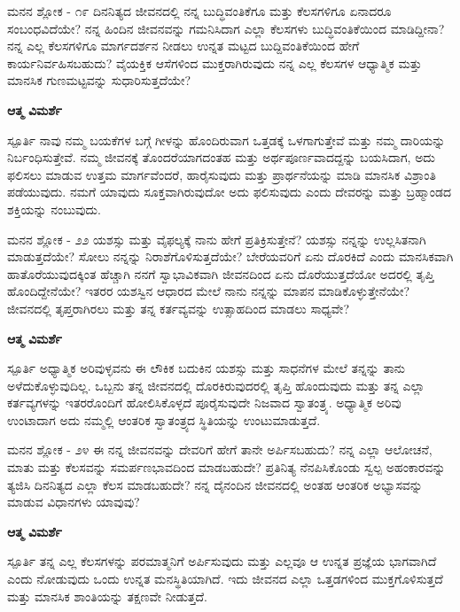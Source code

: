 \newpage
\begin{mananam}{\mananamfont ಮನನ ಶ್ಲೋಕ - ೧೯}
\mananamtext ದಿನನಿತ್ಯದ ಜೀವನದಲ್ಲಿ ನನ್ನ ಬುದ್ಧಿವಂತಿಕೆಗೂ ಮತ್ತು ಕೆಲಸಗಳಿಗೂ ಏನಾದರೂ ಸಂಬಂಧವಿದೆಯೇ? ನನ್ನ ಹಿಂದಿನ ಜೀವನವನ್ನು ಗಮನಿಸಿದಾಗ ಎಲ್ಲಾ ಕೆಲಸಗಳು ಬುದ್ಧಿವಂತಿಕೆಯಿಂದ ಮಾಡಿದ್ದೀನಾ? ನನ್ನ ಎಲ್ಲ ಕೆಲಸಗಳಿಗೂ ಮಾರ್ಗದರ್ಶನ ನೀಡಲು ಉನ್ನತ ಮಟ್ಟದ ಬುದ್ದಿವಂತಿಕೆಯಿಂದ ಹೇಗೆ ಕಾರ್ಯನಿರ್ವಹಿಸಬಹುದು? ವೈಯಕ್ತಿಕ ಆಸೆಗಳಿಂದ ಮುಕ್ತರಾಗಿರುವುದು ನನ್ನ ಎಲ್ಲ ಕೆಲಸಗಳ ಆಧ್ಯಾತ್ಮಿಕ ಮತ್ತು ಮಾನಸಿಕ ಗುಣಮಟ್ಟವನ್ನು ಸುಧಾರಿಸುತ್ತದೆಯೇ?
\end{mananam}
\WritingHand\enspace\textbf{ಆತ್ಮ ವಿಮರ್ಶೆ}\\
\begin{inspiration}{\mananamfont ಸ್ಪೂರ್ತಿ}
\mananamtext ನಾವು ನಮ್ಮ ಬಯಕೆಗಳ ಬಗ್ಗೆ ಗೀಳನ್ನು ಹೊಂದಿರುವಾಗ ಒತ್ತಡಕ್ಕೆ ಒಳಗಾಗುತ್ತೇವೆ ಮತ್ತು ನಮ್ಮ ದಾರಿಯನ್ನು ನಿರ್ಬಂಧಿಸುತ್ತೇವೆ. ನಮ್ಮ ಜೀವನಕ್ಕೆ ತೊಂದರೆಯಾಗದಂತಹ ಮತ್ತು ಅರ್ಥಪೂರ್ಣವಾದದ್ದನ್ನು ಬಯಸಿದಾಗ, ಅದು ಫಲಿಸಲು ಮಾಡುವ ಉತ್ತಮ ಮಾರ್ಗವೆಂದರೆ, ಹಾರೈಸುವುದು ಮತ್ತು ಪ್ರಾರ್ಥನೆಯನ್ನು ಮಾಡಿ ಮಾನಸಿಕ ವಿಶ್ರಾಂತಿ ಪಡೆಯುವುದು. ನಮಗೆ ಯಾವುದು ಸೂಕ್ತವಾಗಿರುವುದೋ ಅದು ಫಲಿಸುವುದು ಎಂದು ದೇವರನ್ನು ಮತ್ತು ಬ್ರಹ್ಮಾಂಡದ ಶಕ್ತಿಯನ್ನು ನಂಬುವುದು.
\end{inspiration}
\newpage

\begin{mananam}{\mananamfont ಮನನ ಶ್ಲೋಕ - ೨೨}
\mananamtext ಯಶಸ್ಸು ಮತ್ತು ವೈಫಲ್ಯಕ್ಕೆ ನಾನು ಹೇಗೆ ಪ್ರತಿಕ್ರಿಸುತ್ತೇನೆ? ಯಶಸ್ಸು ನನ್ನನ್ನು ಉಲ್ಲಸಿತನಾಗಿ ಮಾಡುತ್ತದೆಯೇ? ಸೋಲು ನನ್ನನ್ನು ನಿರಾಶೆಗೊಳಿಸುತ್ತದೆಯೇ? ಬೇರೆಯವರಿಗೆ ಏನು ದೊರಕಿದೆ ಎಂದು ಮಾನಸಿಕವಾಗಿ ಹಾತೊರೆಯುವುದಕ್ಕಿಂತ ಹೆಚ್ಚಾಗಿ ನನಗೆ ಸ್ವಾಭಾವಿಕವಾಗಿ ಜೀವನದಿಂದ ಏನು ದೊರೆಯುತ್ತದೆಯೋ ಅದರಲ್ಲಿ ತೃಪ್ತಿ ಹೊಂದಿದ್ದೇನೆಯೇ? ಇತರರ ಯಶಸ್ವಿನ ಆಧಾರದ ಮೇಲೆ ನಾನು ನನ್ನನ್ನು ಮಾಪನ ಮಾಡಿಕೊಳ್ಳುತ್ತೇನೆಯೇ? ಜೀವನದಲ್ಲಿ ತೃಪ್ತರಾಗಿರಲು ಮತ್ತು ತನ್ನ ಕರ್ತವ್ಯವನ್ನು ಉತ್ಸಾಹದಿಂದ ಮಾಡಲು ಸಾಧ್ಯವೇ?
\end{mananam}
\WritingHand\enspace\textbf{ಆತ್ಮ ವಿಮರ್ಶೆ}\\
\begin{inspiration}{\mananamfont ಸ್ಪೂರ್ತಿ}
\mananamtext ಅಧ್ಯಾತ್ಮಿಕ ಅರಿವುಳ್ಳವನು ಈ ಲೌಕಿಕ ಬದುಕಿನ ಯಶಸ್ಸು ಮತ್ತು ಸಾಧನೆಗಳ ಮೇಲೆ ತನ್ನನ್ನು ತಾನು ಅಳೆದುಕೊಳ್ಳುವುದಿಲ್ಲ. ಒಬ್ಬನು ತನ್ನ ಜೀವನದಲ್ಲಿ ದೊರಕಿರುವುದರಲ್ಲಿ ತೃಪ್ತಿ ಹೊಂದುವುದು ಮತ್ತು ತನ್ನ ಎಲ್ಲಾ ಕರ್ತವ್ಯಗಳನ್ನು ಇತರರೊಂದಿಗೆ ಹೋಲಿಸಿಕೊಳ್ಳದೆ ಪೂರೈಸುವುದೇ ನಿಜವಾದ ಸ್ವಾತಂತ್ರ್ಯ.  ಅಧ್ಯಾತ್ಮಿಕ  ಅರಿವು ಉಂಟಾದಾಗ ಅದು ನಮ್ಮಲ್ಲಿ ಆಂತರಿಕ ಸ್ವಾತಂತ್ರ್ಯದ ಸ್ಥಿತಿಯನ್ನು ಉಂಟುಮಾಡುತ್ತದೆ. 
\end{inspiration}
\newpage

\begin{mananam}{\mananamfont ಮನನ ಶ್ಲೋಕ - ೨೪}
\mananamtext ಈ ನನ್ನ ಜೀವನವನ್ನು ದೇವರಿಗೆ ಹೇಗೆ ತಾನೇ ಅರ್ಪಿಸಬಹುದು? ನನ್ನ ಎಲ್ಲಾ ಆಲೋಚನೆ, ಮಾತು ಮತ್ತು ಕೆಲಸವನ್ನು ಸಮರ್ಪಣಭಾವದಿಂದ ಮಾಡಬಹುದೇ? ಪ್ರತಿನಿತ್ಯ ನೆನಪಿಸಿಕೊಂಡು ಸ್ವಲ್ಪ ಅಹಂಕಾರವನ್ನು ತ್ಯಜಿಸಿ ದಿನನಿತ್ಯದ ಎಲ್ಲಾ ಕೆಲಸ ಮಾಡಬಹುದೇ? ನನ್ನ ದೈನಂದಿನ ಜೀವನದಲ್ಲಿ ಅಂತಹ ಆಂತರಿಕ ಅಭ್ಯಾಸವನ್ನು ಮಾಡುವ ವಿಧಾನಗಳು ಯಾವುವು?
\end{mananam}
\WritingHand\enspace\textbf{ಆತ್ಮ ವಿಮರ್ಶೆ}\\
\begin{inspiration}{\mananamfont ಸ್ಪೂರ್ತಿ}
\mananamtext ತನ್ನ ಎಲ್ಲ ಕೆಲಸಗಳನ್ನು ಪರಮಾತ್ಮನಿಗೆ ಅರ್ಪಿಸುವುದು ಮತ್ತು ಎಲ್ಲವೂ ಆ ಉನ್ನತ ಪ್ರಜ್ಞೆಯ ಭಾಗವಾಗಿದೆ ಎಂದು ನೋಡುವುದು ಒಂದು ಉನ್ನತ ಮನಸ್ಥಿತಿಯಾಗಿದೆ. ಇದು ಜೀವನದ ಎಲ್ಲಾ ಒತ್ತಡಗಳಿಂದ ಮುಕ್ತಗೊಳಿಸುತ್ತದೆ ಮತ್ತು ಮಾನಸಿಕ ಶಾಂತಿಯನ್ನು ತಕ್ಷಣವೇ ನೀಡುತ್ತದೆ.
\end{inspiration}
\newpage

